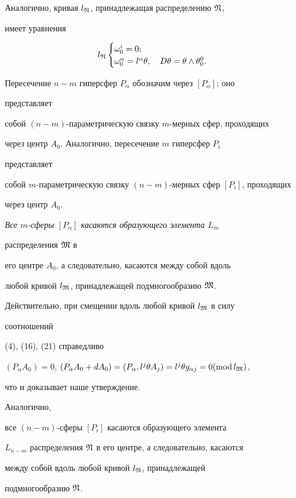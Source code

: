 Аналогично, кривая $l_{\frak N}$, принадлежащая распределению $\frak N$, 


имеет уравнения 


$$ 


l_{\frak N} 


\begin{cases} 


\omega^i_0=0;\\ 


\omega^\alpha_0=l^\alpha\theta,\quad D\theta=\theta\wedge\theta^0_0. 


\end{cases} 


$$ 


 


Пересечение $n-m$ гиперсфер $P_\alpha$ обозначим через $[P_\alpha]$; оно 


представляет 


собой $(n-m)$-параметрическую связку $m$-мерных сфер, проходящих 


через центр $A_0$. Аналогично, пересечение $m$ гиперсфер $P_i$ 


представляет 


собой $m$-параметрическую связку $(n-m)$-мерных сфер $[P_i]$, проходящих 


через центр $A_0$. 


 


{\it Все $m$-сферы $[P_\alpha]$ касаются образующего элемента $L_m$ 


распределения $\frak M$ в 


его центре $A_0$, а следовательно, касаются между собой вдоль 


любой кривой $l_{\frak M}$, принадлежащей подмногообразию $\frak M$.} 


 


Действительно, при смещении вдоль любой кривой $l_{\frak M}$ в силу 


соотношений 


(4), (16), (21) справедливо 


$(P_\alpha A_0)=0$, $(P_\alpha A_0+d A_0)=(P_\alpha, l^j\theta A_j)=l^j 


\theta g_{\alpha j}=0(\Mod l_{\frak M})$, 


что и доказывает наше утверждение. 


 


Аналогично, {\it 


все $(n-m)$-сферы $[P_i]$ касаются образующего элемента 


$L_{n-m}$ распределения $\frak N$ в его центре, а следовательно, касаются 


между собой вдоль любой кривой $l_{\frak N}$, принадлежащей 


подмногообразию $\frak N$.} 


